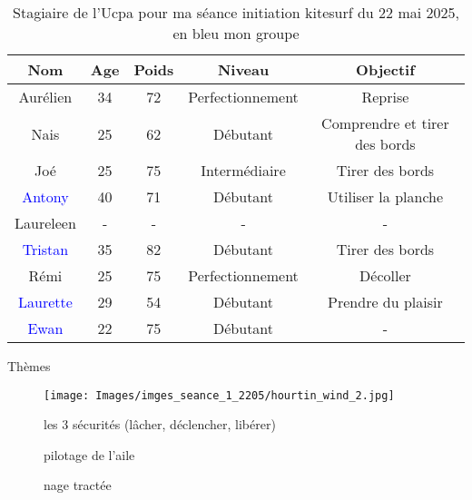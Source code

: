 \documentclass[10pt,a4paper]{beamer}
\begin{document}
\begin{frame}
\small{
\begin{table}
\centering
\begin{tabular}{|c|c|c|c|c|}
        \hline
        \textbf{Nom} & \textbf{Age} & \textbf{Poids}& \textbf{Niveau}     &  \textbf{Objectif} \\ 
        \hline
        Aurélien      &  34          &  72           &   Perfectionnement  & Reprise \\
        Nais          &  25          &  62           &   Débutant          & Comprendre et tirer des bords \\
        Joé         &  25          &  75           &   Intermédiaire     & Tirer des bords \\
        \textcolor{blue}{Antony}        &  40          &  71           &   Débutant          & Utiliser la planche  \\
        Laureleen     &  -           &  -            &   -                 &   -  \\
        \textcolor{blue}{Tristan}       &  35          & 82            &  Débutant           & Tirer des bords  \\
        Rémi          &  25          & 75            &  Perfectionnement           &  Décoller  \\
        \textcolor{blue}{Laurette}      &  29          & 54            &  Débutant           & Prendre du plaisir \\
        \textcolor{blue}{Ewan}          &  22          & 75            & Débutant            &  -  \\
        \hline
\end{tabular}
\caption{Stagiaire de l'Ucpa pour ma séance initiation kitesurf du 22 mai 2025, en bleu mon groupe}
\end{table}}
\end{frame}


\begin{frame}{Thèmes}
\begin{figure}
\texttt{[image: Images/imges\_seance\_1\_2205/hourtin\_wind\_2.jpg]} 
\end{figure}
\begin{figure}
\item les 3 sécurités (l\^acher, déclencher, libérer)
\item pilotage de l'aile
\item nage tractée 
\end{figure}
\end{frame}
\end{document}
